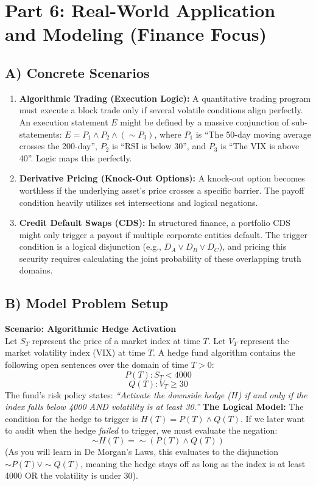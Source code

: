 \documentclass[11pt]{article}
\begin{document}
\section{Part 6: Real-World Application and Modeling (Finance Focus)}

\subsection{A) Concrete Scenarios}
\begin{enumerate}
    \item \textbf{Algorithmic Trading (Execution Logic):} A quantitative trading program must execute a block trade only if several volatile conditions align perfectly. An execution statement $E$ might be defined by a massive conjunction of sub-statements: $E = P_1 \land P_2 \land (\sim P_3)$, where $P_1$ is ``The 50-day moving average crosses the 200-day'', $P_2$ is ``RSI is below 30'', and $P_3$ is ``The VIX is above 40''. Logic maps this perfectly.
    \item \textbf{Derivative Pricing (Knock-Out Options):} A knock-out option becomes worthless if the underlying asset's price crosses a specific barrier. The payoff condition heavily utilizes set intersections and logical negations. 
    \item \textbf{Credit Default Swaps (CDS):} In structured finance, a portfolio CDS might only trigger a payout if multiple corporate entities default. The trigger condition is a logical disjunction (e.g., $D_A \lor D_B \lor D_C$), and pricing this security requires calculating the joint probability of these overlapping truth domains. 
\end{enumerate}

\subsection{B) Model Problem Setup}
\textbf{Scenario: Algorithmic Hedge Activation} \\
Let $S_T$ represent the price of a market index at time $T$. Let $V_T$ represent the market volatility index (VIX) at time $T$. 
A hedge fund algorithm contains the following open sentences over the domain of time $T > 0$:
\[ P(T): S_T < 4000 \]
\[ Q(T): V_T \ge 30 \]
The fund's risk policy states: \textit{``Activate the downside hedge ($H$) if and only if the index falls below 4000 AND volatility is at least 30.'' }
\textbf{The Logical Model:}
The condition for the hedge to trigger is $H(T) = P(T) \land Q(T)$. 
If we later want to audit when the hedge \textit{failed} to trigger, we must evaluate the negation:
\[ \sim H(T) = \sim(P(T) \land Q(T)) \]
(As you will learn in De Morgan's Laws, this evaluates to the disjunction $\sim P(T) \lor \sim Q(T)$, meaning the hedge stays off as long as the index is at least 4000 OR the volatility is under 30).
\end{document}
